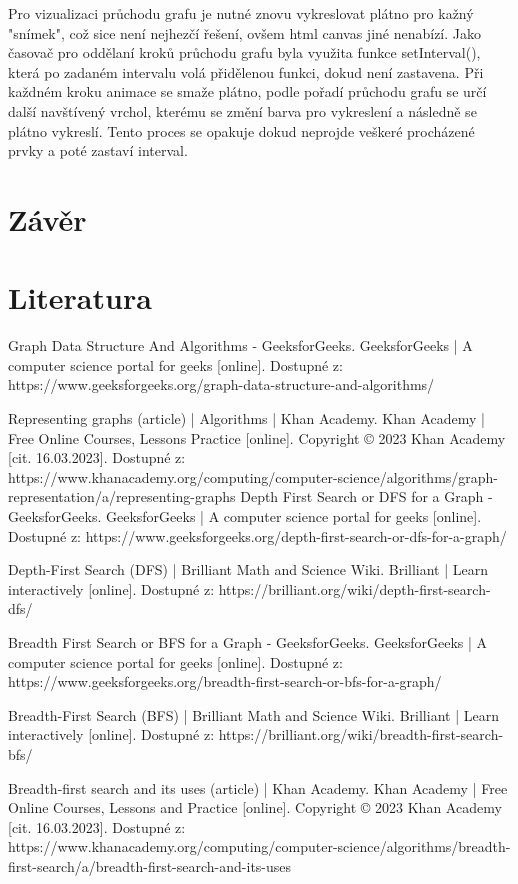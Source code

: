 \documentclass[12pt, titlepage, a4paper]{article}
\begin{document}
Pro vizualizaci průchodu grafu je nutné znovu vykreslovat plátno pro kažný 
"snímek", což sice není nejhezčí řešení, ovšem html canvas jiné nenabízí.
Jako časovač pro oddělaní kroků průchodu grafu byla využita funkce setInterval(),
která po zadaném intervalu volá přidělenou funkci, dokud není zastavena. Při každném
kroku animace se smaže plátno, podle pořadí průchodu grafu se určí další navštívený 
vrchol, kterému se změní barva pro vykreslení a následně se plátno vykreslí. Tento
proces se opakuje dokud neprojde veškeré procházené prvky a poté zastaví interval.

\section{Závěr}

\section{Literatura}
\begin{thebibliography}{99}
    Graph Data Structure And Algorithms - GeeksforGeeks. GeeksforGeeks | A computer science 
    portal for geeks [online]. Dostupné z: https://www.geeksforgeeks.org/graph-data-structure-and-algorithms/

    Representing graphs (article) | Algorithms | Khan Academy. Khan Academy | Free Online Courses, 
    Lessons Practice [online]. Copyright © 2023 Khan Academy [cit. 16.03.2023]. Dostupné z: https://www.khanacademy.org/computing/computer-science/algorithms/graph-representation/a/representing-graphs
    Depth First Search or DFS for a Graph - GeeksforGeeks. GeeksforGeeks | A computer science portal for geeks [online]. Dostupné z: https://www.geeksforgeeks.org/depth-first-search-or-dfs-for-a-graph/
    
    Depth-First Search (DFS) | Brilliant Math and Science Wiki. Brilliant | Learn interactively [online]. Dostupné z: https://brilliant.org/wiki/depth-first-search-dfs/

    Breadth First Search or BFS for a Graph - GeeksforGeeks. GeeksforGeeks | A computer science portal for geeks [online]. Dostupné z: https://www.geeksforgeeks.org/breadth-first-search-or-bfs-for-a-graph/

    Breadth-First Search (BFS) | Brilliant Math and Science Wiki. Brilliant | Learn interactively [online]. Dostupné z: https://brilliant.org/wiki/breadth-first-search-bfs/

    Breadth-first search and its uses (article) | Khan Academy. Khan Academy | Free Online Courses, Lessons and Practice [online]. Copyright © 2023 Khan Academy [cit. 16.03.2023]. Dostupné z: https://www.khanacademy.org/computing/computer-science/algorithms/breadth-first-search/a/breadth-first-search-and-its-uses
\end{thebibliography}
\end{document}
